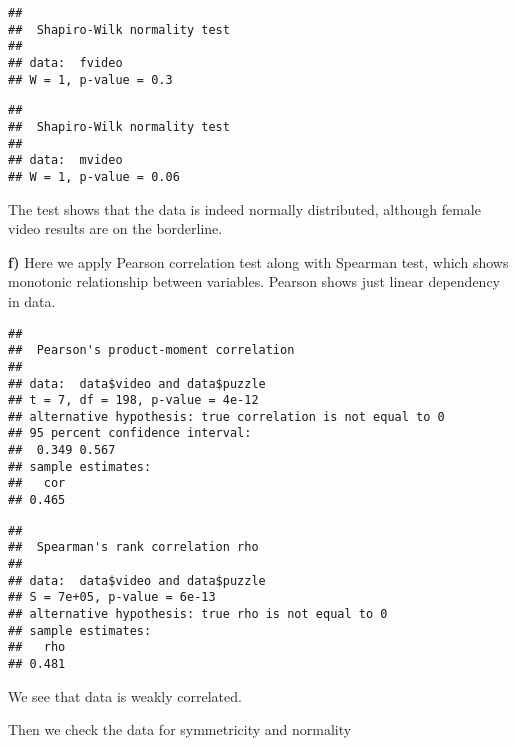 \documentclass[
]{article}
\newenvironment{Shaded}{\begin{snugshade}}{\end{snugshade}}
\newcommand{\AttributeTok}[1]{\textcolor[rgb]{0.13,0.29,0.53}{#1}}
\newcommand{\FunctionTok}[1]{\textcolor[rgb]{0.13,0.29,0.53}{\textbf{#1}}}
\newcommand{\NormalTok}[1]{#1}
\newcommand{\SpecialCharTok}[1]{\textcolor[rgb]{0.81,0.36,0.00}{\textbf{#1}}}
\newcommand{\StringTok}[1]{\textcolor[rgb]{0.31,0.60,0.02}{#1}}
\begin{document}
\begin{verbatim}
## 
##  Shapiro-Wilk normality test
## 
## data:  fvideo
## W = 1, p-value = 0.3
\end{verbatim}

\begin{verbatim}
## 
##  Shapiro-Wilk normality test
## 
## data:  mvideo
## W = 1, p-value = 0.06
\end{verbatim}

The test shows that the data is indeed normally distributed, although
female video results are on the borderline.

\textbf{f)} Here we apply Pearson correlation test along with Spearman
test, which shows monotonic relationship between variables. Pearson
shows just linear dependency in data.

\begin{Shaded}
\end{Shaded}

\begin{verbatim}
## 
##  Pearson's product-moment correlation
## 
## data:  data$video and data$puzzle
## t = 7, df = 198, p-value = 4e-12
## alternative hypothesis: true correlation is not equal to 0
## 95 percent confidence interval:
##  0.349 0.567
## sample estimates:
##   cor 
## 0.465
\end{verbatim}

\begin{Shaded}
\end{Shaded}

\begin{verbatim}
## 
##  Spearman's rank correlation rho
## 
## data:  data$video and data$puzzle
## S = 7e+05, p-value = 6e-13
## alternative hypothesis: true rho is not equal to 0
## sample estimates:
##   rho 
## 0.481
\end{verbatim}

We see that data is weakly correlated.

Then we check the data for symmetricity and normality
\end{document}
